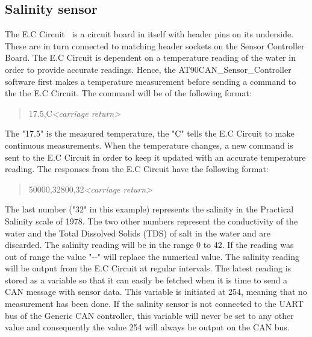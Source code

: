 \subsection{Salinity sensor}
The E.C Circuit~\cite{web:ec_circuit} is a circuit board in itself with header pins on its underside. These are in turn connected to matching header sockets on the Sensor Controller Board. \newline
The E.C Circuit is dependent on a temperature reading of the water in order to provide accurate readings. Hence, the AT90CAN\_Sensor\_Controller software first makes a temperature measurement before sending a command to the the E.C Circuit. The command will be of the following format:

\begin{quote}
17.5,C\emph{<carriage return>}
\end{quote}

The "17.5" is the measured temperature, the "C" tells the E.C Circuit to make continuous measurements. When the temperature changes, a new command is sent to the E.C Circuit in order to keep it updated with an accurate temperature reading. \newline
The responses from the E.C Circuit have the following format:

\begin{quote}
50000,32800,32\emph{<carriage return>}
\end{quote}

The last number ("32" in this example) represents the salinity in the Practical Salinity scale of 1978. The two other numbers represent the conductivity of the water and the Total Dissolved Solids (TDS) of salt in the water and are discarded. The salinity reading will be in the range 0 to 42. If the reading was out of range the value "\--\--" will replace the numerical value. \newline
The salinity reading will be output from the E.C Circuit at regular intervals. The latest reading is stored as a variable so that it can easily be fetched when it is time to send a CAN message with sensor data. This variable is initiated at 254, meaning that no measurement has been done. If the salinity sensor is not connected to the UART bus of the Generic CAN controller, this variable will never be set to any other value and consequently the value 254 will always be output on the CAN bus.
\pagebreak